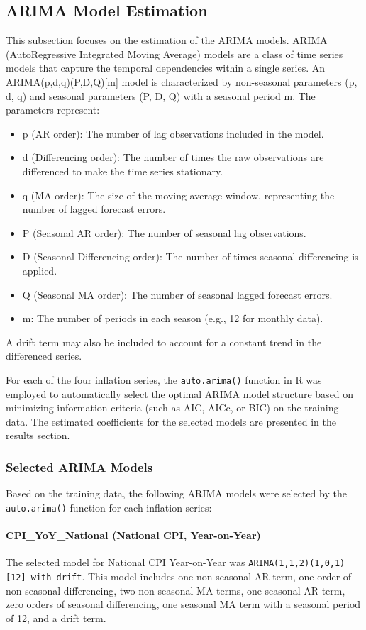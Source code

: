 \documentclass[12pt,a4paper]{article}
\begin{document}
\subsection{ARIMA Model Estimation}
This subsection focuses on the estimation of the ARIMA models. ARIMA (AutoRegressive Integrated Moving Average) models are a class of time series models that capture the temporal dependencies within a single series. An ARIMA(p,d,q)(P,D,Q)[m] model is characterized by non-seasonal parameters (p, d, q) and seasonal parameters (P, D, Q) with a seasonal period m. The parameters represent:
\begin{itemize}
    \item p (AR order): The number of lag observations included in the model.
    \item d (Differencing order): The number of times the raw observations are differenced to make the time series stationary.
    \item q (MA order): The size of the moving average window, representing the number of lagged forecast errors.
    \item P (Seasonal AR order): The number of seasonal lag observations.
    \item D (Seasonal Differencing order): The number of times seasonal differencing is applied.
    \item Q (Seasonal MA order): The number of seasonal lagged forecast errors.
    \item m: The number of periods in each season (e.g., 12 for monthly data).
\end{itemize}
A drift term may also be included to account for a constant trend in the differenced series.

For each of the four inflation series, the \texttt{auto.arima()} function in R was employed to automatically select the optimal ARIMA model structure based on minimizing information criteria (such as AIC, AICc, or BIC) on the training data. The estimated coefficients for the selected models are presented in the results section.

\subsubsection{Selected ARIMA Models}

Based on the training data, the following ARIMA models were selected by the \texttt{auto.arima()} function for each inflation series:

\paragraph{CPI\_YoY\_National (National CPI, Year-on-Year)}
The selected model for National CPI Year-on-Year was \texttt{ARIMA(1,1,2)(1,0,1)[12] with drift}. This model includes one non-seasonal AR term, one order of non-seasonal differencing, two non-seasonal MA terms, one seasonal AR term, zero orders of seasonal differencing, one seasonal MA term with a seasonal period of 12, and a drift term.
\end{document}
